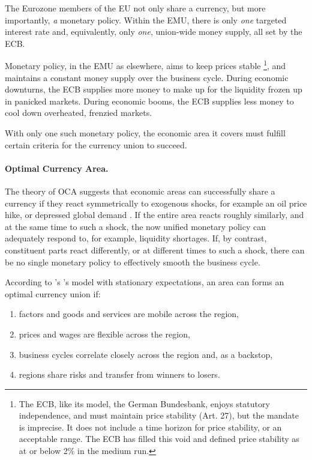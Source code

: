 \documentclass[11pt,a4paper,oneside,openright]{article}
\begin{document}
The Eurozone members of the \gls{EU} not only share a currency, but more importantly, \emph{a} monetary policy. 
Within the \gls{EMU}, there is only \emph{one} targeted interest rate and, equivalently, only \emph{one}, union-wide money supply, all set by the \gls{ECB}.

Monetary policy, in the \gls{EMU} as elsewhere, aims to keep prices stable
\footnote{
	The \gls{ECB}, like its model, the German Bundesbank, enjoys statutory independence, and must maintain price stability (Art. 27), but the mandate is imprecise. 
	It does not include a time horizon for price stability, or an acceptable range.	
	The \gls{ECB} has filled this void and defined price stability as at or below 2\% in the medium run.
}, 
and maintains a constant money supply over the business cycle. 
During economic downturns, the \gls{ECB} supplies more money to make up for the liquidity frozen up in panicked markets. 
During economic booms, the \gls{ECB} supplies less money to cool down overheated, frenzied markets. 

With only one such monetary policy, the economic area it covers must fulfill certain criteria for the currency union to succeed.

\paragraph{Optimal Currency Area.}  \label{sec:OCA} The theory of \gls{OCA} suggests that economic areas can successfully share a currency if they react symmetrically to exogenous shocks, for example an oil price hike, or depressed global demand \citep{Mundell1961}. 
If the entire area reacts roughly similarly, and at the same time to such a shock, the now unified monetary policy can adequately respond to, for example, liquidity shortages. 
If, by contrast, constituent parts react differently, or at different times to such a shock, there can be no single monetary policy to effectively smooth the business cycle.

According to \citeauthor{Mundell1961}'s \citeyearpar{Mundell1961}'s  model with stationary expectations, an area can forms an optimal currency union if:
\begin{enumerate}
	\item factors and goods and services are mobile across the region, 
	\item prices and wages are flexible across the region,
	\item business cycles correlate closely across the region and, as a backstop,
	\item regions share risks and transfer from winners to losers.
\end{enumerate}
\end{document}
